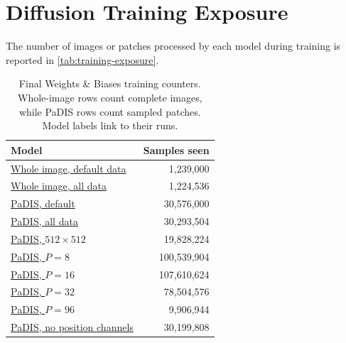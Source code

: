 \chapter{Diffusion Training Exposure}
\label{app:training-exposure}
The number of images or patches processed by each model during training is reported in \autoref{tab:training-exposure}.

\begin{table}[htbp]
\centering
\caption[Diffusion training exposure.]{Final Weights \& Biases training counters. Whole-image rows count complete images, while PaDIS rows count sampled patches. Model labels link to their runs.}
\label{tab:training-exposure}
\small
\begin{tabular}{lr}
\toprule[1.1pt]
\textbf{Model} & \textbf{Samples seen} \\
\midrule
\href{https://wandb.ai/tjh200-university-of-cambridge/PaDIS-Reproduction/runs/xq69oaui}{Whole image, default data} & 1,239,000 \\
\href{https://wandb.ai/tjh200-university-of-cambridge/PaDIS-Reproduction/runs/9e3903d7}{Whole image, all data} & 1,224,536 \\
\midrule
\href{https://wandb.ai/tjh200-university-of-cambridge/PaDIS-Reproduction/runs/3r8yjo1x}{PaDIS, default} & 30,576,000 \\
\href{https://wandb.ai/tjh200-university-of-cambridge/PaDIS-Reproduction/runs/vd4zu3h2}{PaDIS, all data} & 30,293,504 \\
\href{https://wandb.ai/tjh200-university-of-cambridge/PaDIS-Reproduction/runs/k3ewkq7y}{PaDIS, $512\times512$} & 19,828,224 \\
\href{https://wandb.ai/tjh200-university-of-cambridge/PaDIS-Reproduction/runs/zgivu4ud}{PaDIS, $P=8$} & 100,539,904 \\
\href{https://wandb.ai/tjh200-university-of-cambridge/PaDIS-Reproduction/runs/uaasmrt6}{PaDIS, $P=16$} & 107,610,624 \\
\href{https://wandb.ai/tjh200-university-of-cambridge/PaDIS-Reproduction/runs/88014kal}{PaDIS, $P=32$} & 78,504,576 \\
\href{https://wandb.ai/tjh200-university-of-cambridge/PaDIS-Reproduction/runs/e24q8o1e}{PaDIS, $P=96$} & 9,906,944 \\
\href{https://wandb.ai/tjh200-university-of-cambridge/PaDIS-Reproduction/runs/aqh1bipv}{PaDIS, no position channels} & 30,199,808 \\
\bottomrule[1.1pt]
\end{tabular}
\end{table}
